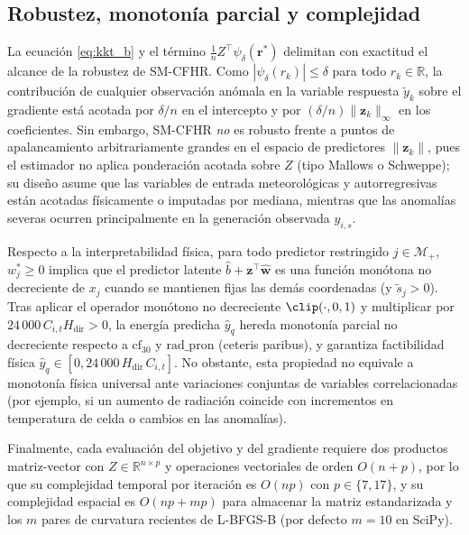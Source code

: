 \subsection{Robustez, monotonía parcial y complejidad}

La ecuación \eqref{eq:kkt_b} y el término $\frac{1}{n}Z^\top \psi_\delta(\mathbf{r}^*)$ delimitan con exactitud el alcance de la robustez de SM-CFHR. Como $|\psi_\delta(r_k)| \le \delta$ para todo $r_k \in \mathbb{R}$, la contribución de cualquier observación anómala en la variable respuesta $\tilde{y}_k$ sobre el gradiente está acotada por $\delta/n$ en el intercepto y por $(\delta/n)\|\mathbf{z}_k\|_\infty$ en los coeficientes. Sin embargo, SM-CFHR \emph{no} es robusto frente a puntos de apalancamiento arbitrariamente grandes en el espacio de predictores $\|\mathbf{z}_k\|$, pues el estimador no aplica ponderación acotada sobre $Z$ (tipo Mallows o Schweppe); su diseño asume que las variables de entrada meteorológicas y autorregresivas están acotadas físicamente o imputadas por mediana, mientras que las anomalías severas ocurren principalmente en la generación observada $y_{i,s}$.

Respecto a la interpretabilidad física, para todo predictor restringido $j \in \mathcal{M}_+$, $w_j^* \ge 0$ implica que el predictor latente $\hat{b} + \mathbf{z}^\top \hat{\mathbf{w}}$ es una función monótona no decreciente de $x_j$ cuando se mantienen fijas las demás coordenadas (y $\tilde{s}_j > 0$). Tras aplicar el operador monótono no decreciente $\clip(\cdot, 0, 1)$ y multiplicar por $24\,000\,C_{i,t} H_{\mathrm{dir}} > 0$, la energía predicha $\hat{y}_q$ hereda monotonía parcial no decreciente respecto a $\mathrm{cf}_{30}$ y $\mathrm{rad\_pron}$ (ceteris paribus), y garantiza factibilidad física $\hat{y}_q \in [0, 24\,000\,H_{\mathrm{dir}}\,C_{i,t}]$. No obstante, esta propiedad no equivale a monotonía física universal ante variaciones conjuntas de variables correlacionadas (por ejemplo, si un aumento de radiación coincide con incrementos en temperatura de celda o cambios en las anomalías).

Finalmente, cada evaluación del objetivo y del gradiente requiere dos productos matriz-vector con $Z \in \mathbb{R}^{n \times p}$ y operaciones vectoriales de orden $O(n + p)$, por lo que su complejidad temporal por iteración es $O(np)$ con $p \in \{7, 17\}$, y su complejidad espacial es $O(np + mp)$ para almacenar la matriz estandarizada y los $m$ pares de curvatura recientes de L-BFGS-B (por defecto $m=10$ en SciPy).
